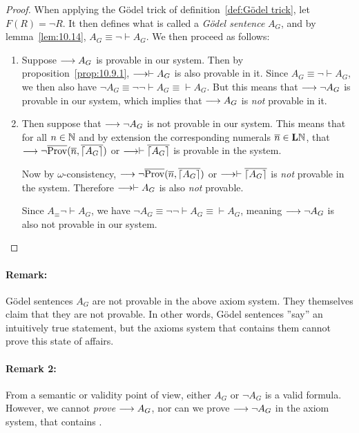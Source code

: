 \documentclass[11pt,a4paper]{article}
\begin{document}
\begin{proof}
    When applying the Gödel trick of definition~\ref{def:Gödel trick},
    let \(F(R) = \lnot R\). It then defines what is called a \emph{Gödel sentence}
    \(A_G\), and by lemma~\ref{lem:10.14}, \(A_G \equiv\lnot\vdash A_G\).
    We then proceed as follows:
    \begin{enumerate}
        \item
            Suppose \(\seq A_G\) is provable in our system.
            Then by proposition~\ref{prop:10.9.1}, \(\seq\vdash A_G\)
            is also provable in it. Since \(A_G \equiv\lnot\vdash A_G\),
            we then also have \(\lnot A_G \equiv \lnot\lnot\vdash A_G \equiv\vdash A_G\).
            But this means that \(\seq\lnot A_G\) is provable in our system,
            which implies that \(\seq A_G\) is \emph{not} provable in it.
        \item
            Then suppose that \(\seq\lnot A_G\) is not provable in our system.
            This means that for all \(n\in\Nset\) and by extension the corresponding
            numerals \(\num n\in\LN\), that \(\seq\lnot\num\Prov(\num n, \num{\G{A_G}})\)
            or \(\seq\vdash\num{\G{A_G}}\) is provable in the system.

            Now by \(\omega\)-consistency,
            \(\seq\lnot\num\Prov(\num n, \num{\G{A_G}})\)
            or \(\seq\vdash\num{\G{A_G}}\) is \emph{not} provable in the system.
            Therefore \(\seq\vdash A_G\) is also \emph{not} provable.

            Since \(A_\equiv\lnot\vdash A_G\),
            we have \(\lnot A_G\equiv\lnot\lnot\vdash A_G\equiv\vdash A_G\),
            meaning \(\seq\lnot A_G\) is also not provable in our system.
    \end{enumerate}
\end{proof}

\paragraph{Remark:}
Gödel sentences \(A_G\) are not provable in the above axiom system.
They themselves claim that they are not provable.
In other words, Gödel sentences ''say'' an intuitively true statement,
but the axioms system that contains them cannot prove this state of affairs.

\paragraph{Remark 2:}
From a semantic or validity point of view, either \(A_G\) or \(\lnot A_G\)
is a valid formula. However, we cannot \emph{prove} \(\seq A_G\),
nor can we prove \(\seq\lnot A_G\) in the axiom system,
that contains \PA{}.
\end{document}
